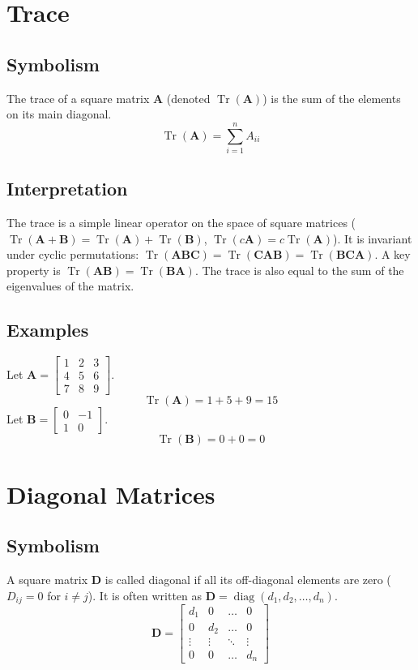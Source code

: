 \documentclass{article}
\newcommand{\mat}[1]{\bm{#1}}  %
\DeclareMathOperator{\Tr}{Tr}
\DeclareMathOperator{\diag}{diag}  %
\begin{document}
\section{Trace}

\subsection*{Symbolism}
The trace of a square matrix $\mat{A}$ (denoted $\Tr(\mat{A})$) is the sum of the elements on its main diagonal.
\[ \Tr(\mat{A}) = \sum_{i=1}^{n} A_{ii} \]

\subsection*{Interpretation}
The trace is a simple linear operator on the space of square matrices ($\Tr(\mat{A}+\mat{B}) = \Tr(\mat{A}) + \Tr(\mat{B})$, $\Tr(c\mat{A}) = c\Tr(\mat{A})$). It is invariant under cyclic permutations: $\Tr(\mat{A}\mat{B}\mat{C}) = \Tr(\mat{C}\mat{A}\mat{B}) = \Tr(\mat{B}\mat{C}\mat{A})$. A key property is $\Tr(\mat{A}\mat{B}) = \Tr(\mat{B}\mat{A})$. The trace is also equal to the sum of the eigenvalues of the matrix.

\subsection*{Examples}
Let $\mat{A} = \begin{bmatrix} 1 & 2 & 3 \\ 4 & 5 & 6 \\ 7 & 8 & 9 \end{bmatrix}$.
\[ \Tr(\mat{A}) = 1 + 5 + 9 = 15 \]
Let $\mat{B} = \begin{bmatrix} 0 & -1 \\ 1 & 0 \end{bmatrix}$.
\[ \Tr(\mat{B}) = 0 + 0 = 0 \]

\section{Diagonal Matrices}

\subsection*{Symbolism}
A square matrix $\mat{D}$ is called diagonal if all its off-diagonal elements are zero ($D_{ij} = 0$ for $i \neq j$). It is often written as $\mat{D} = \diag(d_1, d_2, \dots, d_n)$.
\[ \mat{D} = \begin{bmatrix} d_1 & 0 & \dots & 0 \\ 0 & d_2 & \dots & 0 \\ \vdots & \vdots & \ddots & \vdots \\ 0 & 0 & \dots & d_n \end{bmatrix} \]
\end{document}
